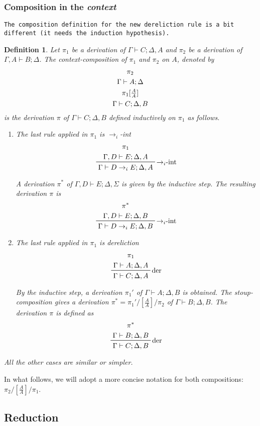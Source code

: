 \documentclass{article}
\newcommand{\ifi}{$\to_i$-int}
\newcommand{\comp}[1]{[\tfrac{#1}{#1}]}
\newtheorem{definition}{Definition}[section]
\begin{document}
\subsubsection{Composition in the \emph{context}}

\texttt{The composition definition for the new dereliction rule is a bit different (it needs the induction hypothesis).}

\begin{definition}
  Let $\pi_1$ be a derivation of $\Gamma\vdash C; \Delta, A$ and $\pi_2$ be a derivation of $\Gamma, A\vdash B; \Delta$. The \emph{context-composition} of $\pi_1$ and $\pi_2$ on $A$, denoted by
  \[\prftree[noline]{\prftree[noline]{\prftree[noline]{\pi_2}{\Gamma\vdash A; \Delta}}{\pi_1\comp{A}}}{\Gamma\vdash C; \Delta, B}\]
  is the derivation $\pi$ of $\Gamma\vdash C; \Delta, B$ defined inductively on $\pi_1$ as follows.

  \begin{enumerate}
  \item The last rule applied in $\pi_1$ is \ifi{}
    \[\prftree[r]{\ifi}{
        \prftree[noline]{
          \pi_1}{
          \Gamma, D\vdash E; \Delta, A}}{
        \Gamma\vdash D\to_i E; \Delta, A}
    \]

    A derivation $\pi^*$ of $\Gamma, D\vdash E; \Delta, \Sigma$ is given by the inductive step. The resulting derivation $\pi$ is
    \[\prftree[r]{\ifi}{
        \prftree[noline]{
          \pi^*}{
          \Gamma, D\vdash E; \Delta, B}}{
        \Gamma\vdash D\to_i E; \Delta, B}
    \]
    \ttfamily{}
  \item[2.] The last rule applied in $\pi_1$ is dereliction
    \[\prftree[r]{der}{
        \prftree[noline]{\pi_1}{\Gamma\vdash A; \Delta, A}}{
        \Gamma\vdash C; \Delta, A}
    \]

    By the inductive step, a derivation $\pi_1'$ of $\Gamma\vdash A; \Delta, B$ is obtained. The stoup-composition gives a derivation $\pi^* = \pi_1'/\comp{A}/\pi_2$ of $\Gamma\vdash B; \Delta, B$. The derivation $\pi$ is defined as
    \[\prftree[r]{der}{
        \prftree[noline]{\pi^*}{\Gamma\vdash B; \Delta, B}}{
        \Gamma\vdash C; \Delta, B}
    \]
    \normalfont{}
  \end{enumerate}
  All the other cases are similar or simpler.
\end{definition}

In what follows, we will adopt a more concise notation for both compositions: $\pi_2/\comp{A}/\pi_1$.

\subsection{Reduction}
\end{document}
